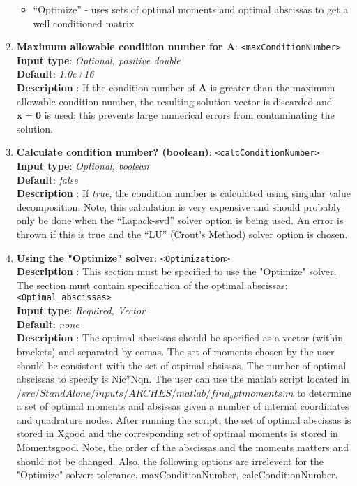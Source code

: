 \begin{enumerate}
\begin{itemize}
\item ``Optimize'' - uses sets of optimal moments and optimal abscissas to get a well conditioned matrix
\end{itemize}
%
\item {\bf  Maximum allowable condition number for $\mathbf{A}$}: \verb=<maxConditionNumber>= \\
{\bf Input type}: {\it Optional, positive double} \\
{\bf Default}: {\it 1.0e+16} \\
{\bf Description }: If the condition number of $\mathbf{A}$ is greater than the maximum allowable condition number, the resulting solution vector is discarded and $\mathbf{x = 0}$ is used; this prevents large numerical errors from contaminating the solution.
%
\item {\bf Calculate condition number? (boolean)}: \verb=<calcConditionNumber>= \\
{\bf Input type}: {\it Optional, boolean} \\
{\bf Default}: {\it false} \\
{\bf Description }: If {\it true}, the condition number is calculated using singular value decomposition.  Note, this calculation is very expensive and should probably only be done when the ``Lapack-svd'' solver option is being used.  An error is thrown if this is true and the ``LU'' (Crout's Method) solver option is chosen.
%
\item {\bf Using the "Optimize" solver}: \verb=<Optimization>= \\
{\bf Description }: This section must be specified to use the "Optimize" solver. The section must contain specification of the optimal abscissas: \\
\verb=<Optimal_abscissas>= \\
{\bf Input type}: {\it Required, Vector} \\
{\bf Default}: {\it none} \\
{\bf Description }: The optimal abscissas should be specified as a vector (within brackets) and separated by comas. The set of moments chosen by the user should be consistent with the set of otpimal absissas. The number of optimal abscissas to specify is Nic*Nqn.  The user can use the matlab script located in $/src/StandAlone/inputs/ARCHES/matlab/find_optmoments.m$ to determine a set of optimal moments and absissas given a number of internal coordinates and quadrature nodes. After running the script, the set of optimal abscissas is stored in Xgood and the corresponding set of optimal moments is stored in Momentsgood. Note, the order of the abscissas and the moments matters and should not be changed. Also, the following options are irrelevent for the "Optimize" solver: tolerance, maxConditionNumber, calcConditionNumber. \\
%
\end{enumerate}



